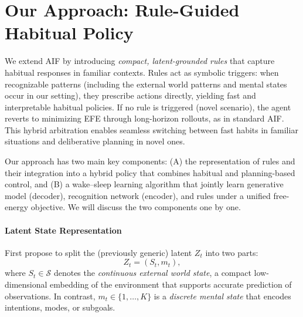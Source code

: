 \documentclass{article} %
\begin{document}
\section{Our Approach: Rule-Guided Habitual Policy}
\label{sec:method}
We extend AIF by introducing \emph{compact, latent-grounded rules} that capture habitual responses in familiar contexts.  
Rules act as symbolic triggers: when recognizable patterns (including the external world patterns and mental states occur in our setting), they prescribe actions directly, yielding fast and interpretable habitual policies.  
If no rule is triggered (novel scenario), the agent reverts to minimizing EFE through long-horizon rollouts, as in standard AIF.  
This hybrid arbitration enables seamless switching between fast habits in familiar situations and deliberative planning in novel ones.  

Our approach has two main key components: 
(A) the representation of rules and their integration into a hybrid policy that combines habitual and planning-based control, and 
(B) a wake--sleep learning algorithm that jointly learn 
generative model (decoder), recognition network (encoder), and rules under a unified free-energy objective. We will discuss the two components one by one. 

\paragraph{Latent State Representation} First propose to split the (previously generic) latent \(Z_t\) into two parts:
\[
Z_t = (S_t, m_t),
\]
where \(S_t\in\mathcal S\) denotes the \emph{continuous external world state}, a compact low-dimensional embedding of the environment that supports accurate prediction of observations.  
In contrast, \(m_t \in \{1,\dots,K\}\) is a \emph{discrete mental state} that encodes intentions, modes, or subgoals.  
\end{document}

